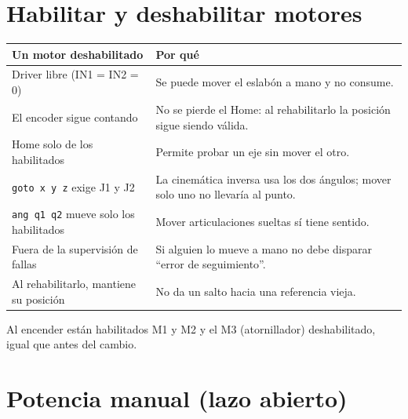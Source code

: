 \documentclass[11pt]{article}
\newcommand{\cod}[1]{\texttt{#1}}
\begin{document}
\section{Habilitar y deshabilitar motores}

\begin{table}[H]\centering\small
\begin{tabular}{>{\raggedright\arraybackslash}p{3.6cm}>{\raggedright\arraybackslash}p{12cm}}
\toprule
Un motor deshabilitado & Por qué \\
\midrule
Driver libre (IN1 = IN2 = 0) & Se puede mover el eslabón a mano y no consume. \\
El encoder sigue contando & No se pierde el Home: al rehabilitarlo la posición sigue siendo válida. \\
Home solo de los habilitados & Permite probar un eje sin mover el otro. \\
\cod{goto x y z} exige J1 y J2 & La cinemática inversa usa los dos ángulos; mover solo uno no llevaría al punto. \\
\cod{ang q1 q2} mueve solo los habilitados & Mover articulaciones sueltas sí tiene sentido. \\
Fuera de la supervisión de fallas & Si alguien lo mueve a mano no debe disparar ``error de seguimiento''. \\
Al rehabilitarlo, mantiene su posición & No da un salto hacia una referencia vieja. \\
\bottomrule
\end{tabular}
\end{table}
Al encender están habilitados M1 y M2 y el M3 (atornillador) deshabilitado, igual que antes del cambio.

\section{Potencia manual (lazo abierto)}
\end{document}
